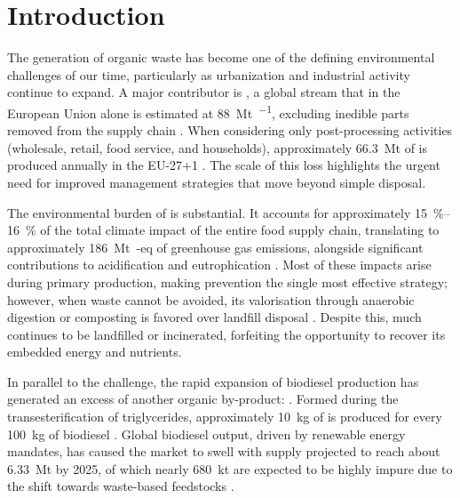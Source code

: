 \chapter{Introduction}
\label{ch:introduction}

The generation of organic waste has become one of the defining environmental challenges of our time, particularly as urbanization and industrial activity continue to expand. A major contributor is , a global stream that in the European Union alone is estimated at \qty{88}{\mega\tonne\per\yr}, excluding inedible parts removed from the supply chain \parencite{scherhaufer2018}. When considering only post-processing activities (wholesale, retail, food service, and households), approximately \qty{66.3}{\mega\tonne} of  is produced annually in the EU-27+1 \parencite{albizzati2021}. The scale of this loss highlights the urgent need for improved management strategies that move beyond simple disposal.

The environmental burden of  is substantial. It accounts for approximately \qtyrange{15}{16}{\percent} of the total climate impact of the entire food supply chain, translating to approximately \qty{186}{\mega\tonne\CO}-eq of greenhouse gas emissions, alongside significant contributions to acidification and eutrophication \parencite{scherhaufer2018}. Most of these impacts arise during primary production, making prevention the single most effective strategy; however, when waste cannot be avoided, its valorisation through anaerobic digestion or composting is favored over landfill disposal \parencite{albizzati2021, scherhaufer2018}. Despite this, much  continues to be landfilled or incinerated, forfeiting the opportunity to recover its embedded energy and nutrients.

In parallel to the  challenge, the rapid expansion of biodiesel production has generated an excess of another organic by-product: . Formed during the transesterification of triglycerides, approximately \qty{10}{\kilo\gram} of  is produced for every \qty{100}{\kilo\gram} of biodiesel \parencite{garlapati2016}. Global biodiesel output, driven by renewable energy mandates, has caused the  market to swell with  supply projected to reach about \qty{6.33}{\mega\tonne} by 2025, of which nearly \qty{680}{\kilo\tonne} are expected to be highly impure due to the shift towards waste-based feedstocks \parencite{attarbachi2023}.

